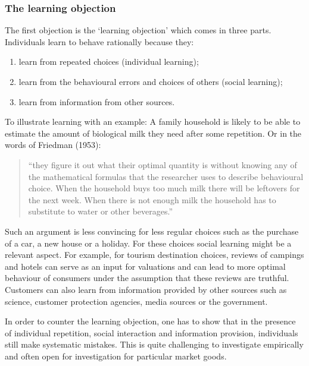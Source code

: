 \documentclass[
]{book}
\providecommand{\tightlist}{%
  \setlength{\itemsep}{0pt}\setlength{\parskip}{0pt}}
\begin{document}
\hypertarget{the-learning-objection}{%
\subsubsection{The learning objection}\label{the-learning-objection}}

The first objection is the `learning objection' which comes in three parts. Individuals learn to behave rationally because they:

\begin{enumerate}
\def\labelenumi{(\roman{enumi})}
\tightlist
\item
  learn from repeated choices (individual learning);
\item
  learn from the behavioural errors and choices of others (social learning);
\item
  learn from information from other sources.
\end{enumerate}

To illustrate learning with an example: A family household is likely to be able to estimate the amount of biological milk they need after some repetition. Or in the words of Friedman (1953):

\begin{quote}
``they figure it out what their optimal quantity is without knowing any of the mathematical formulas that the researcher uses to describe behavioural choice. When the household buys too much milk there will be leftovers for the next week. When there is not enough milk the household has to substitute to water or other beverages.''
\end{quote}

Such an argument is less convincing for less regular choices such as the purchase of a car, a new house or a holiday. For these choices social learning might be a relevant aspect. For example, for tourism destination choices, reviews of campings and hotels can serve as an input for valuations and can lead to more optimal behaviour of consumers under the assumption that these reviews are truthful. Customers can also learn from information provided by other sources such as science, customer protection agencies, media sources or the government.

In order to counter the learning objection, one has to show that in the presence of individual repetition, social interaction and information provision, individuals still make systematic mistakes. This is quite challenging to investigate empirically and often open for investigation for particular market goods.
\end{document}
